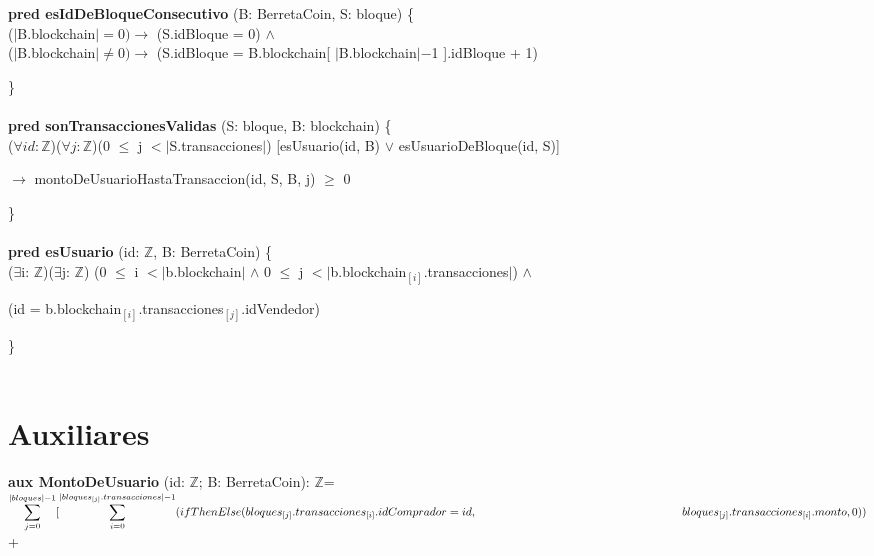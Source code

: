 \documentclass{article}
\newcommand{\Entero}{$\mathds{Z}$}
\begin{document}
    \textbf{pred esIdDeBloqueConsecutivo} (B: BerretaCoin, S: bloque) \{\\
        \indent\indent ($|$B.blockchain$| = 0)\rightarrow$ (S.idBloque = 0) $\land$\\
        \indent\indent ($|$B.blockchain$| \ne 0) \rightarrow$ (S.idBloque = B.blockchain[ $|$B.blockchain$|-$1 ].idBloque + 1)

    \}\\\\

    \textbf{pred sonTransaccionesValidas} (S: bloque, B: blockchain) \{\\
        \indent\indent ($\forall id:$\Entero)($\forall j:$\Entero)(0 $\le$ j $<|$S.transacciones$|$) [esUsuario(id, B) $\lor$ esUsuarioDeBloque(id, S)]
        
        \indent\indent\indent\indent\indent\indent\indent $\rightarrow$ montoDeUsuarioHastaTransaccion(id, S, B, j) $\ge$ 0

    \}\\\\

    \textbf{pred esUsuario} (id: \Entero, B: BerretaCoin) \{\\
        \indent\indent($\exists$i: \Entero)($\exists$j: \Entero) (0 $\leq$ i $< |$b.blockchain$|$ $\land$ 0 $\le$ j $< |$b.blockchain$_{[i]}$.transacciones$|$) $\land$

        \indent\indent(id = b.blockchain$_{[i]}$.transacciones$_{[j]}$.idVendedor)

    \}\\\\











\newpage
\section*{Auxiliares}

    \textbf{aux MontoDeUsuario} (id: \Entero; B: BerretaCoin): \Entero =\\

        \indent\indent
        $\mathlarger\sum\limits_{j=0}^{|bloques| - 1}
        [\mathlarger\sum\limits_{i=0}^{|bloques_{[j]}.transacciones|-1} (ifThenElse (bloques_{[j]}.transacciones_{[i]}.idComprador = id,\\
        \indent\indent\indent\indent\indent\indent\indent\indent\indent\indent\indent\indent bloques_{[j]}.transacciones_{[i]}.monto, 0))$ + \\
\end{document}
